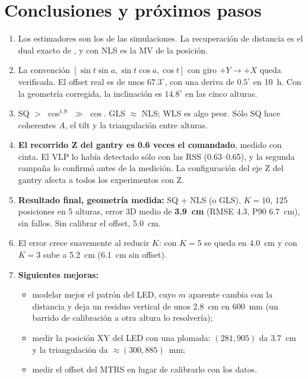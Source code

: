 \documentclass[11pt,a4paper]{article}
\begin{document}
\section{Conclusiones y próximos pasos}
\begin{enumerate}
\item Los estimadores son los de las simulaciones. La recuperación de distancia es el dual exacto de , y con NLS es la MV de la posición.
\item La convención $[\sin t\sin a,\sin t\cos a,\cos t]$ con giro $+Y\to+X$ queda verificada. El offset real es de unos $67.3^\circ$, con una deriva de $0.5^\circ$ en 10~h. Con la geometría corregida, la inclinación es $14.8^\circ$ en las cinco alturas.
\item SQ $>$ $\cos^{1.9}$ $\gg$ $\cos$. GLS $\approx$ NLS; WLS es algo peor. Sólo SQ hace coherentes $A$, el tilt y la triangulación entre alturas.
\item \textbf{El recorrido Z del gantry es 0.6 veces el comandado}, medido con cinta. El VLP lo había detectado sólo con las RSS (0.63--0.65), y la segunda campaña lo confirmó antes de la medición. La configuración del eje Z del gantry afecta a todos los experimentos con Z.
\item \textbf{Resultado final, geometría medida:} SQ + NLS (o GLS), $K=10$, 125 posiciones en 5 alturas, error 3D medio de \textbf{3.9~cm} (RMSE 4.3, P90 6.7~cm), sin fallos. Sin calibrar el offset, 5.0~cm.
\item El error crece suavemente al reducir $K$: con $K=5$ se queda en 4.0~cm y con $K=3$ sube a 5.2~cm (6.1~cm sin offset).
\item \textbf{Siguientes mejoras:}
\begin{itemize}
\item modelar mejor el patrón del LED, cuyo $m$ aparente cambia con la distancia y deja un residuo vertical de unos 2.8~cm en 600~mm (un barrido de calibración a otra altura lo resolvería);
\item medir la posición XY del LED con una plomada: $(281,905)$ da 3.7~cm y la triangulación da $\approx(300,885)$~mm;
\item medir el offset del MTRS en lugar de calibrarlo con los datos.
\end{itemize}
\end{enumerate}

\appendix
\end{document}
